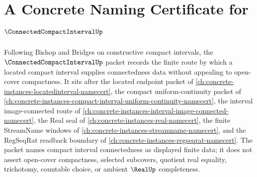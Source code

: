 \chapter{A Concrete Naming Certificate for $\ConnectedCompactIntervalUp$}
\label{ch:concrete-instances-connected-compact-interval-namecert}

Following Bishop and Bridges on constructive compact intervals, the $\ConnectedCompactIntervalUp$ packet records the finite route by which a located compact interval supplies connectedness data without appealing to open-cover compactness. It sits after the located endpoint packet of \autoref{ch:concrete-instances-locatedinterval-namecert}, the compact uniform-continuity packet of \autoref{ch:concrete-instances-compact-interval-uniform-continuity-namecert}, the interval image-connected route of \autoref{ch:concrete-instances-interval-image-connected-namecert}, the Real seal of \autoref{ch:concrete-instances-real-namecert}, the finite StreamName windows of \autoref{ch:concrete-instances-streamname-namecert}, and the RegSeqRat readback boundary of \autoref{ch:concrete-instances-regseqrat-namecert}. The packet names compact interval connectedness as displayed finite data; it does not assert open-cover compactness, selected subcovers, quotient real equality, trichotomy, countable choice, or ambient $\RealUp$ completeness.

